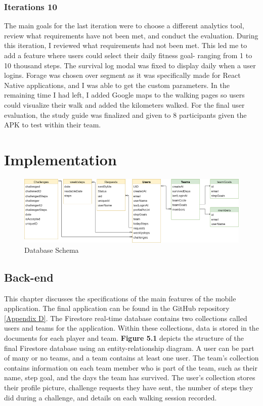 \documentclass{l4proj}
\begin{document}
\subsection{Iterations 10}
The main goals for the last iteration were to choose a different analytics tool, review what requirements have not been met, and conduct the evaluation. 
During this iteration, I reviewed what requirements had not been met. This led me to add a feature where users could select their daily fitness goal- ranging from 1 to 10 thousand steps. The survival log modal was fixed to display daily when a user logins. Forage was chosen over segment as it was specifically made for React Native applications, and I was able to get the custom parameters. In the remaining time I had left, I added Google maps to the walking pages so users could visualize their walk and added the kilometers walked. 
For the final user evaluation, the study guide was finalized and given to 8 participants given the APK to test within their team. 

\chapter{Implementation }

  \begin{figure}[h]
    \centering
     \includegraphics[width=140mm]{dissertation/images/12.png}
     \caption{Database Schema}
     \setlength{\belowcaptionskip}{-10pt}
     \label{fig: Forms of exercise}
 \end{figure}
 
\section{Back-end}
This chapter discusses the specifications of the main features of the mobile application. The final application can be found in the GitHub repository \ref{Appendix D}. 
The Firestore real-time database contains two collections called users and teams for the application. Within these collections, data is stored in the documents for each player and team. \textbf{Figure 5.1} depicts the structure of the final Firestore database using an entity-relationship diagram. A user can be part of many or no teams, and a team contains at least one user. The team's collection contains information on each team member who is part of the team, such as their name, step goal, and the days the team has survived. The user's collection stores their profile picture, challenge requests they have sent, the number of steps they did during a challenge, and details on each walking session recorded. 
\end{document}
